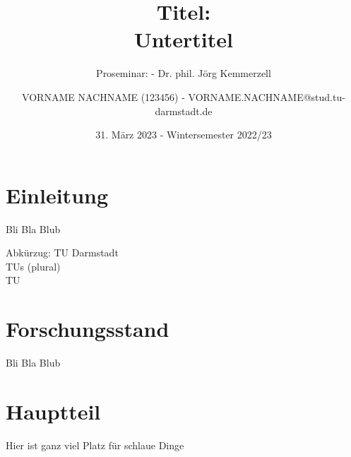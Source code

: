 \documentclass[
	ngerman, 
	fontsize=9pt,
	accentcolor=1b,%
	type=intern,
	marginpar=false,
	]{tudapub}
\begin{document}
\title{Titel: \\ Untertitel}
\subtitle{Proseminar:  - Dr. phil. Jörg Kemmerzell}
\author{VORNAME NACHNAME (123456) - VORNAME.NACHNAME@stud.tu-darmstadt.de }
\date{31. März 2023 - Wintersemester 2022/23} %

\maketitle
{} 
\fontsize{12pt}{14.4}\selectfont %

\tableofcontents
\newpage




\section{Einleitung}
\begin{changemargin}{0.5cm}{0.5cm}

Bli Bla Blub

Abkürzug: \ac{TU} Darmstadt \\ \acp{TU} (plural) \\ \ac{TU}


\end{changemargin}


\section{Forschungsstand}
\begin{changemargin}{0.5cm}{0.5cm}

Bli Bla Blub

\end{changemargin}


\section{Hauptteil}
\begin{changemargin}{0.5cm}{0.5cm}

Hier ist ganz viel Platz für schlaue Dinge \citep{murphyGlobalGovernancePoorly2000}

\end{changemargin}
\end{document}
